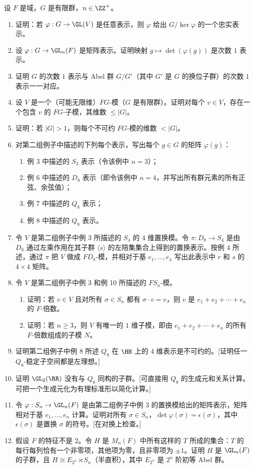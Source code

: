 设 $F$ 是域，$G$ 是有限群，$n\in\ZZ^+$。
\begin{enumerate}[label=\arabic*.]
  \item 证明：若 $\varphi:G\to\GL(V)$ 是任意表示，则 $\varphi$ 给出 $G/\ker\varphi$ 的一个忠实表示。
  \item 设 $\varphi:G\to\GL_n(F)$ 是矩阵表示。证明映射 $g\mapsto\det(\varphi(g))$ 是次数 $1$ 表示。
  \item 证明 $G$ 的次数 $1$ 表示与 Abel 群 $G/G'$（其中 $G'$ 是 $G$ 的换位子群）的次数 $1$ 表示一一对应。
  \item 设 $V$ 是一个（可能无限维）$FG$-模（$G$ 是有限群）。证明对每个 $v\in V$，存在一个包含 $v$ 的 $FG$-子模，其维数 $\leq |G|$。
  \item 证明：若 $|G|>1$，则每个不可约 $FG$-模的维数 $<|G|$。
  \item 对第二组例子中描述的下列每个表示，写出每个 $g\in G$ 的矩阵 $\varphi(g)$：
  \begin{enumerate}[label=(\alph*)]
    \item 例 3 中描述的 $S_3$ 表示（令该例中 $n=3$）；
    \item 例 6 中描述的 $D_8$ 表示（即令该例中 $n=4$，并写出所有群元素的所有正弦、余弦值）；
    \item 例 7 中描述的 $Q_8$ 表示；
    \item 例 8 中描述的 $Q_8$ 表示。
  \end{enumerate}
  \item 令 $V$ 是第二组例子中例 3 所描述的 $S_4$ 的 $4$ 维置换模。令 $\pi:D_8\to S_4$ 是由 $D_8$ 通过左乘作用在其子群 $\langle s\rangle$ 的左陪集集合上得到的置换表示。按例 4 所述，通过 $\pi$ 把 $V$ 做成 $FD_8$-模，并相对于基 $e_1,
  \ldots,e_4$ 写出此表示中 $r$ 和 $s$ 的 $4\times4$ 矩阵。
  \item 令 $V$ 是第二组例子中例 3 和例 10 所描述的 $FS_n$-模。
  \begin{enumerate}[label=(\alph*)]
    \item 证明：若 $v\in V$ 且对所有 $\sigma\in S_n$ 都有 $\sigma\cdot v=v$，则 $v$ 是 $e_1+e_2+\cdots+e_n$ 的 $F$-倍数。
    \item 证明：若 $n\geq3$，则 $V$ 有唯一的 $1$ 维子模，即由 $e_1+e_2+\cdots+e_n$ 的所有 $F$-倍数组成的子模 $N$。
  \end{enumerate}
  \item 证明第二组例子中例 8 所述 $Q_8$ 在 $\HH$ 上的 $4$ 维表示是不可约的。[证明任一 $Q_8$-稳定子空间都是左理想。]
  \item 证明 $\GL_2(\RR)$ 没有与 $Q_8$ 同构的子群。[可直接用 $Q_8$ 的生成元和关系计算。可把一个生成元化为有理标准形以简化计算。]
  \item 令 $\varphi:S_n\to\GL_n(F)$ 是由第二组例子中例 3 的置换模给出的矩阵表示，矩阵相对于基 $e_1,
  \ldots,e_n$ 计算。证明对所有 $\sigma\in S_n$，$\det\varphi(\sigma)=\epsilon(\sigma)$，其中 $\epsilon(\sigma)$ 是置换 $\sigma$ 的符号。[在对换上检查。]
  \item 假设 $F$ 的特征不是 $2$。令 $H$ 是 $M_n(F)$ 中所有这样的 $T$ 所成的集合：$T$ 的每行每列恰有一个非零项，其他项为零，且非零项为 $\pm1$。证明 $H$ 是 $\GL_n(F)$ 的子群，且 $H\cong E_{2^n}\rtimes S_n$（半直积），其中 $E_{2^n}$ 是 $2^n$ 阶初等 Abel 群。
\end{enumerate}

